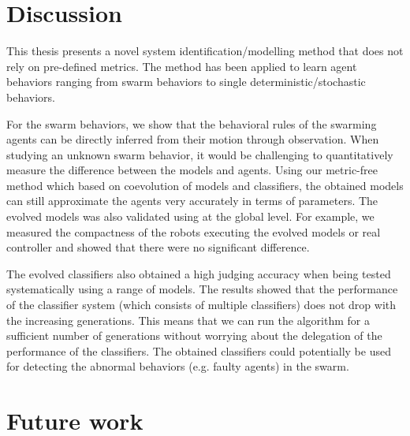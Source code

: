 \section{Discussion}

This thesis presents a novel system identification/modelling method that does not rely on pre-defined metrics. The method has been applied to learn agent behaviors ranging from swarm behaviors to single deterministic/stochastic behaviors. 

For the swarm behaviors, we show that the behavioral rules of the swarming agents can be directly inferred from their motion through observation. When studying an unknown swarm behavior, it would be challenging to quantitatively measure the difference between the models and agents. Using our metric-free method which based on coevolution of models and classifiers, the obtained models can still approximate the agents very accurately in terms of parameters. The evolved models was also validated using at the global level. For example, we measured the compactness of the robots executing the evolved models or real controller and showed that there were no significant difference. 

The evolved classifiers also obtained a high judging accuracy when being tested systematically using a range of models. The results showed that the performance of the classifier system (which consists of multiple classifiers) does not drop with the increasing generations. This means that we can run the algorithm for a sufficient number of generations without worrying about the delegation of the performance of the classifiers. The obtained classifiers could potentially be used for detecting the abnormal behaviors (e.g. faulty agents) in the swarm. 

\section{Future work}

